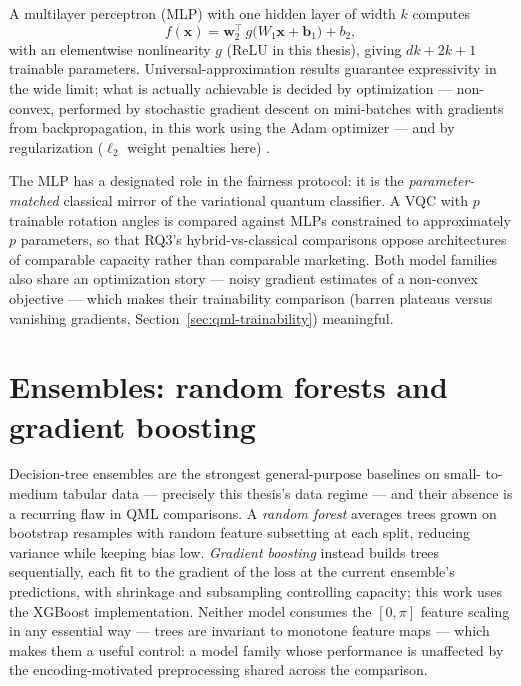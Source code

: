 A multilayer perceptron (MLP) with one hidden layer of width $k$ computes
\begin{equation}
  f(\bm{x}) = \bm{w}_2^{\top}\, g\bigl( W_1 \bm{x} + \bm{b}_1 \bigr) + b_2,
\end{equation}
with an elementwise nonlinearity $g$ (ReLU in this thesis), giving
$dk + 2k + 1$ trainable parameters. Universal-approximation results guarantee
expressivity in the wide limit; what is actually achievable is decided by
optimization --- non-convex, performed by stochastic gradient descent on
mini-batches with gradients from backpropagation, in this work using the Adam
optimizer \citep{kingma2015adam} --- and by regularization ($\ell_2$ weight
penalties here) \citep{goodfellow2016deep}.

The MLP has a designated role in the fairness protocol: it is the
\emph{parameter-matched} classical mirror of the variational quantum
classifier. A VQC with $p$ trainable rotation angles is compared against MLPs
constrained to approximately $p$ parameters, so that RQ3's hybrid-vs-classical
comparisons oppose architectures of comparable capacity rather than comparable
marketing. Both model families also share an optimization story --- noisy
gradient estimates of a non-convex objective --- which makes their trainability
comparison (barren plateaus versus vanishing gradients,
Section~\ref{sec:qml-trainability}) meaningful.

\section{Ensembles: random forests and gradient boosting}
\label{sec:ml-ensembles}

Decision-tree ensembles are the strongest general-purpose baselines on small-%
to-medium tabular data --- precisely this thesis's data regime --- and their
absence is a recurring flaw in QML comparisons. A \emph{random forest}
\citep{breiman2001rf} averages trees grown on bootstrap resamples with random
feature subsetting at each split, reducing variance while keeping bias low.
\emph{Gradient boosting} \citep{chen2016xgboost} instead builds trees
sequentially, each fit to the gradient of the loss at the current ensemble's
predictions, with shrinkage and subsampling controlling capacity; this work
uses the XGBoost implementation. Neither model consumes the $[0,\pi]$ feature
scaling in any essential way --- trees are invariant to monotone feature maps
--- which makes them a useful control: a model family whose performance is
unaffected by the encoding-motivated preprocessing shared across the
comparison.

